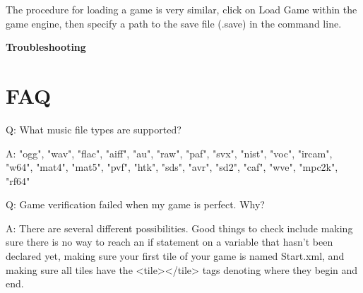 \documentclass[11pt]{article}
\begin{document}
The procedure for loading a game is very similar, click on Load Game within the game engine, then specify a path to the save file (.save) in the command line.

\begin{center}\huge \bf Troubleshooting
\end{center}

\section{FAQ}

Q: What music file types are supported?

A: 
"ogg", "wav", "flac", "aiff", "au", 
"raw", "paf", "svx", "nist", "voc", 
"ircam", "w64", "mat4", "mat5", "pvf", 
"htk", "sds", "avr", "sd2", "caf", "wve", "mpc2k", "rf64"


Q: Game verification failed when my game is perfect. Why?

A: There are several different possibilities. Good things to check include making sure there is no way to reach an if statement on a variable that hasn't been declared yet, making sure your first tile of your game is named Start.xml, and making sure all tiles have the <tile></tile> tags denoting where they begin and end. 
\end{document}
